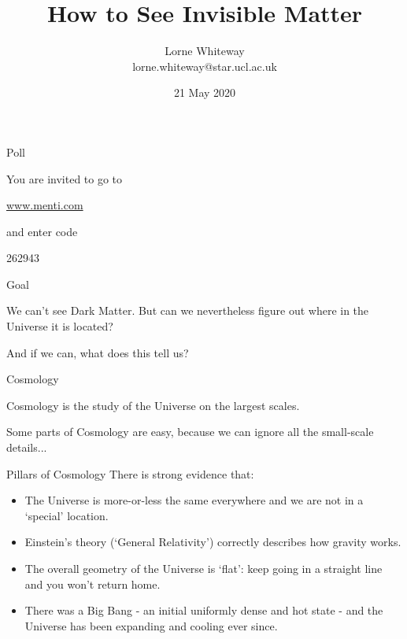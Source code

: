 \documentclass[usenames,dvipsnames]{beamer}
\title{How to See Invisible Matter}
\author{Lorne Whiteway \\ lorne.whiteway@star.ucl.ac.uk}
\institute{Astrophysics Group \\ Department of Physics and Astronomy \\ University College London}
\date{21 May 2020}
\newcommand{\mentiurl}[0]{{\url{www.menti.com}}}
\newcommand{\menticode}[0]{{262943}}
\begin{document}
\frame{\titlepage}


\begin{frame}{Poll}
  \begin{block}{}
    You are invited to go to\\
    \begin{center}
    \huge \alert{\mentiurl{}}\\
    \end{center}
    and enter code\\
    \begin{center}
    \huge \menticode{}
    \end{center}
  \end{block}
\end{frame}

\begin{frame}{Goal}
  \begin{block}{}
    We can't see Dark Matter. But can we nevertheless figure out where in the Universe it is located?
  \end{block}
  \begin{block}{}
    And if we can, what does this tell us?
  \end{block}
\end{frame}

\begin{frame}{Cosmology}
  \begin{block}{}
    Cosmology is the study of the Universe on the largest scales.
  \end{block}
  \begin{block}{}
    Some parts of Cosmology are easy, because we can ignore all the small-scale details...
  \end{block}
\end{frame}

\begin{frame}{Pillars of Cosmology}
  There is strong evidence that:
  \begin{block}{}
    \begin{itemize}
      \item{The Universe is more-or-less the same everywhere and we are not in a `special' location.}
      \item{Einstein's theory (`General Relativity') correctly describes how gravity works.}
      \item{The overall geometry of the Universe is `flat': keep going in a straight line and you won't return home.}
      \item{There was a Big Bang - an initial uniformly dense and hot state - and the Universe has been expanding and cooling ever since.}
    \end{itemize}
  \end{block}
\end{frame}
\end{document}
